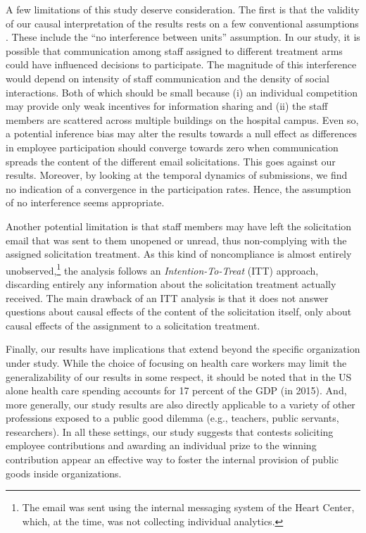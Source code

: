 \documentclass[11pt, titlepage]{article}
\begin{document}
A few limitations of this study deserve consideration. The first is that
the validity of our causal interpretation of the results rests on a few
conventional assumptions \citep{rubin1974estimating}. These include the
``no interference between units'' assumption. In our study, it is
possible that communication among staff assigned to different treatment
arms could have influenced decisions to participate. The magnitude of
this interference would depend on intensity of staff communication and
the density of social interactions. Both of which should be small
because (i) an individual competition may provide only weak incentives
for information sharing and (ii) the staff members are scattered across
multiple buildings on the hospital campus. Even so, a potential
inference bias may alter the results towards a null effect as
differences in employee participation should converge towards zero when
communication spreads the content of the different email solicitations.
This goes against our results. Moreover, by looking at the temporal
dynamics of submissions, we find no indication of a convergence in the
participation rates. Hence, the assumption of no interference seems
appropriate.

Another potential limitation is that staff members may have left the
solicitation email that was sent to them unopened or unread, thus
non-complying with the assigned solicitation treatment. As this kind of
noncompliance is almost entirely unobserved,\footnote{The email was sent
  using the internal messaging system of the Heart Center, which, at the
  time, was not collecting individual analytics.} the analysis follows
an \emph{Intention-To-Treat} (ITT) approach, discarding entirely any
information about the solicitation treatment actually received. The main
drawback of an ITT analysis is that it does not answer questions about
causal effects of the content of the solicitation itself, only about
causal effects of the assignment to a solicitation treatment.

Finally, our results have implications that extend beyond the specific
organization under study. While the choice of focusing on health care
workers may limit the generalizability of our results in some respect,
it should be noted that in the US alone health care spending accounts
for 17 percent of the GDP (in 2015). And, more generally, our study
results are also directly applicable to a variety of other professions
exposed to a public good dilemma (e.g., teachers, public servants,
researchers). In all these settings, our study suggests that contests
soliciting employee contributions and awarding an individual prize to
the winning contribution appear an effective way to foster the internal
provision of public goods inside organizations.

\renewcommand\refname{References}

\end{document}
